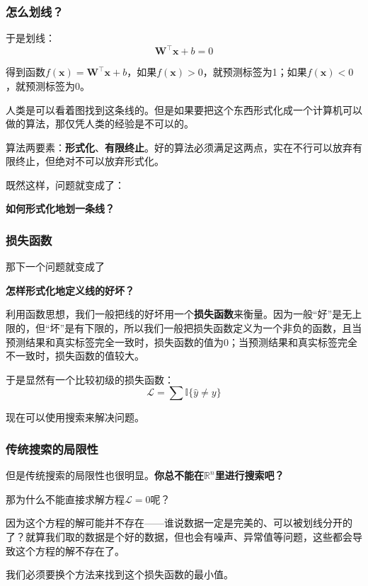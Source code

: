\documentclass{ctexbeamer}
\begin{document}
\begin{frame}
    \frametitle{怎么划线？}

    于是划线：
    \[ \mathbf{W}^\top \mathbf{x} + b = 0 \]

    得到函数$f(\mathbf{x}) = \mathbf{W}^\top \mathbf{x} + b$，如果$f(\mathbf{x}) > 0$，就预测标签为1；如果$f(\mathbf{x}) < 0$，就预测标签为0。

    人类是可以看着图找到这条线的。但是如果要把这个东西形式化成一个计算机可以做的算法，那仅凭人类的经验是不可以的。

    算法两要素：\textbf{形式化}、\textbf{有限终止}。好的算法必须满足这两点，实在不行可以放弃有限终止，但绝对不可以放弃形式化。

    既然这样，问题就变成了：
\begin{center}
    \Large\color{blue} \textbf{如何形式化地划一条线？}
\end{center}

\end{frame}

\begin{frame}
    \frametitle{损失函数}

    那下一个问题就变成了

    \begin{center}
        \Large\color{blue}  \textbf{怎样形式化地定义线的好坏？}
    \end{center}

    利用函数思想，我们一般把线的好坏用一个\textbf{损失函数}来衡量。因为一般“好”是无上限的，但“坏”是有下限的，所以我们一般把损失函数定义为一个非负的函数，且当预测结果和真实标签完全一致时，损失函数的值为0；当预测结果和真实标签完全不一致时，损失函数的值较大。

    于是显然有一个比较初级的损失函数：
    \[ \mathcal{L} = \sum \mathbb{I} \{ \hat{y} \neq y \} \]

    现在可以使用搜索来解决问题。

\end{frame}

\begin{frame}
    \frametitle{传统搜索的局限性}

    但是传统搜索的局限性也很明显。\textbf{你总不能在$\mathbb{R}^n$里进行搜索吧？}

    那为什么不能直接求解方程$\mathcal{L} = 0$呢？

    因为这个方程的解可能并不存在——谁说数据一定是完美的、可以被划线分开的了？就算我们取的数据是个好的数据，但也会有噪声、异常值等问题，这些都会导致这个方程的解不存在了。

    我们必须要换个方法来找到这个损失函数的最小值。

\end{frame}
\end{document}
